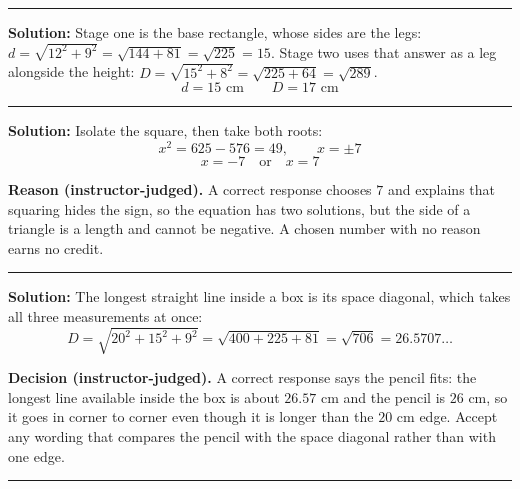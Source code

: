 \documentclass[12pt]{article}
\begin{document}
\vspace{0.2cm}

\noindent\rule{\linewidth}{0.2pt}


\textbf{Solution:} \quad Stage one is the base rectangle, whose sides are the legs:
$d = \sqrt{12^2 + 9^2} = \sqrt{144 + 81} = \sqrt{225} = 15$. Stage two uses that answer as a leg
alongside the height: $D = \sqrt{15^2 + 8^2} = \sqrt{225 + 64} = \sqrt{289}$.
\[ \boxed{d = 15 \text{ cm} \qquad D = 17 \text{ cm}} \]

\vspace{0.2cm}

\noindent\rule{\linewidth}{0.2pt}


\textbf{Solution:} \quad Isolate the square, then take both roots:
\[ x^2 = 625 - 576 = 49, \qquad x = \pm 7 \]
\[ \boxed{x = -7 \quad \text{or} \quad x = 7} \]

\textbf{Reason (instructor-judged).} A correct response chooses $7$ and explains that squaring
hides the sign, so the equation has two solutions, but the side of a triangle is a length and
cannot be negative. A chosen number with no reason earns no credit.

\vspace{0.2cm}

\noindent\rule{\linewidth}{0.2pt}


\textbf{Solution:} \quad The longest straight line inside a box is its space diagonal, which
takes all three measurements at once:
\[ D = \sqrt{20^2 + 15^2 + 9^2} = \sqrt{400 + 225 + 81} = \sqrt{706} = 26.5707\ldots \]

\textbf{Decision (instructor-judged).} A correct response says the pencil fits: the longest line
available inside the box is about $26.57$ cm and the pencil is $26$ cm, so it goes in corner to
corner even though it is longer than the $20$ cm edge. Accept any wording that compares the
pencil with the space diagonal rather than with one edge.

\vspace{0.2cm}

\noindent\rule{\linewidth}{0.2pt}

\end{document}
